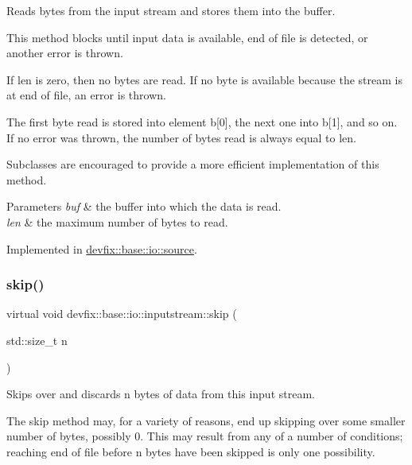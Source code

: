 Reads bytes from the input stream and stores them into the buffer. 

This method blocks until input data is available, end of file is detected, or another error is thrown.

If len is zero, then no bytes are read. If no byte is available because the stream is at end of file, an error is thrown.

The first byte read is stored into element b\mbox{[}0\mbox{]}, the next one into b\mbox{[}1\mbox{]}, and so on. If no error was thrown, the number of bytes read is always equal to len.

Subclasses are encouraged to provide a more efficient implementation of this method.


\begin{DoxyParams}{Parameters}
{\em buf} & the buffer into which the data is read. \\
\hline
{\em len} & the maximum number of bytes to read. \\
\hline
\end{DoxyParams}


Implemented in \hyperlink{structdevfix_1_1base_1_1io_1_1source_a9fbd4d20aa150910ced44018e1b3156a}{devfix\+::base\+::io\+::source}.

\mbox{\label{structdevfix_1_1base_1_1io_1_1inputstream_a1868a733fd646b29daae6874e07e4e03}} 
\subsubsection{\texorpdfstring{skip()}{skip()}}
{\footnotesize\ttfamily virtual void devfix\+::base\+::io\+::inputstream\+::skip (\begin{DoxyParamCaption}\item[{std\+::size\+\_\+t}]{n }\end{DoxyParamCaption})\hspace{0.3cm}{\ttfamily [pure virtual]}}



Skips over and discards n bytes of data from this input stream. 

The skip method may, for a variety of reasons, end up skipping over some smaller number of bytes, possibly 0. This may result from any of a number of conditions; reaching end of file before n bytes have been skipped is only one possibility.


